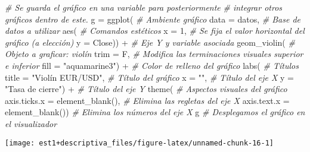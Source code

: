 \documentclass[
]{book}
\newenvironment{Shaded}{\begin{snugshade}}{\end{snugshade}}
\newcommand{\AttributeTok}[1]{\textcolor[rgb]{0.77,0.63,0.00}{#1}}
\newcommand{\CommentTok}[1]{\textcolor[rgb]{0.56,0.35,0.01}{\textit{#1}}}
\newcommand{\DecValTok}[1]{\textcolor[rgb]{0.00,0.00,0.81}{#1}}
\newcommand{\FunctionTok}[1]{\textcolor[rgb]{0.00,0.00,0.00}{#1}}
\newcommand{\NormalTok}[1]{#1}
\newcommand{\OtherTok}[1]{\textcolor[rgb]{0.56,0.35,0.01}{#1}}
\newcommand{\SpecialCharTok}[1]{\textcolor[rgb]{0.00,0.00,0.00}{#1}}
\newcommand{\StringTok}[1]{\textcolor[rgb]{0.31,0.60,0.02}{#1}}
\theoremstyle{definition}
\theoremstyle{definition}
\theoremstyle{definition}
\theoremstyle{definition}
\theoremstyle{remark}
\begin{document}
\begin{Shaded}
\begin{Highlighting}[]
\CommentTok{\# Se guarda el gráfico en una variable para posteriormente}
\CommentTok{\# integrar otros gráficos dentro de este.}
\NormalTok{g }\OtherTok{=} \FunctionTok{ggplot}\NormalTok{( }\CommentTok{\# Ambiente gráfico}
  \AttributeTok{data =}\NormalTok{ datos, }\CommentTok{\# Base de datos a utilizar}
  \FunctionTok{aes}\NormalTok{( }\CommentTok{\# Comandos estéticos}
    \AttributeTok{x =} \DecValTok{1}\NormalTok{, }\CommentTok{\# Se fija el valor horizontal del gráfico (a elección)}
    \AttributeTok{y =}\NormalTok{ Close)) }\SpecialCharTok{+} \CommentTok{\# Eje Y y variable asociada}
  \FunctionTok{geom\_violin}\NormalTok{( }\CommentTok{\# Objeto a graficar: violín}
    \AttributeTok{trim =}\NormalTok{ F, }\CommentTok{\# Modifica las terminaciones visuales superior e inferior}
    \AttributeTok{fill =} \StringTok{"aquamarine3"}\NormalTok{) }\SpecialCharTok{+} \CommentTok{\# Color de relleno del gráfico}
  \FunctionTok{labs}\NormalTok{( }\CommentTok{\# Títulos}
    \AttributeTok{title =} \StringTok{"Violín EUR/USD"}\NormalTok{, }\CommentTok{\# Título del gráfico}
    \AttributeTok{x =} \StringTok{""}\NormalTok{, }\CommentTok{\# Título del eje X}
    \AttributeTok{y =} \StringTok{"Tasa de cierre"}\NormalTok{) }\SpecialCharTok{+} \CommentTok{\# Título del eje Y}
  \FunctionTok{theme}\NormalTok{( }\CommentTok{\# Aspectos visuales del gráfico}
    \AttributeTok{axis.ticks.x =} \FunctionTok{element\_blank}\NormalTok{(), }\CommentTok{\# Elimina las regletas del eje X}
    \AttributeTok{axis.text.x =} \FunctionTok{element\_blank}\NormalTok{()) }\CommentTok{\# Elimina los números del eje X}
\NormalTok{g }\CommentTok{\# Desplegamos el gráfico en el visualizador}
\end{Highlighting}
\end{Shaded}

\begin{center}\texttt{[image: est1+descriptiva\_files/figure-latex/unnamed-chunk-16-1]} \end{center}
\end{document}
